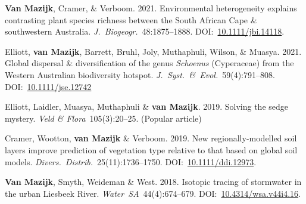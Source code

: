 \begin{hangparas}{2em}{1}

\textbf{Van Mazijk}, Cramer, \& Verboom.
2021.
Environmental heterogeneity explains contrasting plant species richness between
the South African Cape \& southwestern Australia.
\textit{J.~Biogeogr.}~48:1875--1888.
DOI:~\href{https://doi.org/10.1111/jbi.14118}{10.1111/jbi.14118}.

Elliott, \textbf{van Mazijk}, Barrett, Bruhl,
Joly, Muthaphuli, Wilson, \& Muasya.
2021.
Global dispersal \& diversification of the genus \textit{Schoenus} (Cyperaceae)
from the Western Australian biodiversity hotspot.
\textit{J.~Syst.~\&~Evol.}~59(4):791--808.
DOI:~\href{https://doi.org/10.1111/jse.1274}{10.1111/jse.12742}

Elliott, Laidler, Muasya, Muthaphuli \& \textbf{van Mazijk}.
2019.
Solving the sedge mystery.
\textit{Veld \& Flora}~105(3):20--25.
(Popular article)

Cramer, Wootton, \textbf{van Mazijk} \& Verboom.
2019.
New regionally-modelled soil layers improve prediction of vegetation type
relative to that based on global soil models.
\textit{Divers.~Distrib.}~25(11):1736--1750.
DOI:~\href{https://doi.org/10.1111/ddi.12973}{10.1111/ddi.12973}.

\textbf{Van Mazijk}, Smyth, Weideman \& West.
2018.
Isotopic tracing of stormwater in the urban Liesbeek River.
\textit{Water~SA}~44(4):674--679.
DOI:~\href{https://doi.org/10.4314/wsa.v44i4.16}{10.4314/wsa.v44i4.16}.

\end{hangparas}
